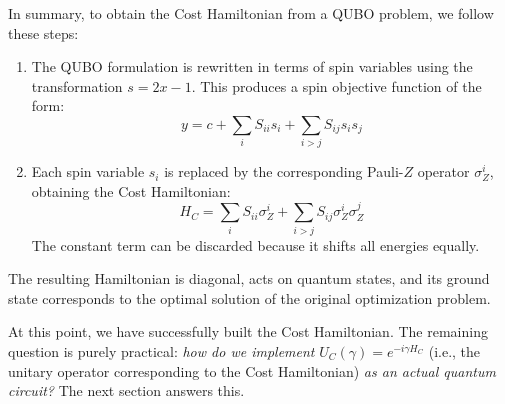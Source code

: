 \highspace
In summary, to obtain the Cost Hamiltonian from a QUBO problem, we follow these steps:
\begin{enumerate}
    \item The QUBO formulation is rewritten in terms of spin variables using the transformation $s=2x-1$. This produces a spin objective function of the form:
    \begin{equation*}
        y = c + \sum_i S_{ii} s_i + \sum_{i>j} S_{ij} s_i s_j
    \end{equation*}
    \item Each spin variable $s_i$ is replaced by the corresponding Pauli-$Z$ operator $\sigma_{Z}^{i}$, obtaining the Cost Hamiltonian:
    \begin{equation*}
        H_C = \sum_i S_{ii} \sigma_{Z}^{i} + \sum_{i > j} S_{ij} \sigma_{Z}^{i} \sigma_{Z}^{j}
    \end{equation*}
    The constant term can be discarded because it shifts all energies equally.
\end{enumerate}
The resulting Hamiltonian is diagonal, acts on quantum states, and its ground state corresponds to the optimal solution of the original optimization problem.

\highspace
At this point, we have successfully built the Cost Hamiltonian. The remaining question is purely practical: \emph{how do we implement} $U_C(\gamma) = e^{-i \gamma H_C}$ (i.e., the unitary operator corresponding to the Cost Hamiltonian) \emph{as an actual quantum circuit?} The next section answers this.